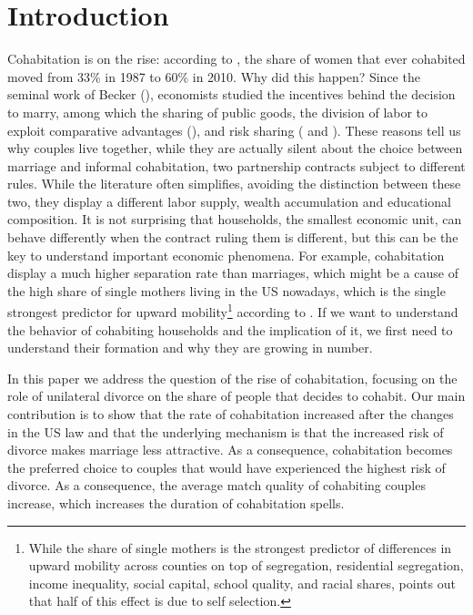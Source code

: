\documentclass[12pt]{article}
\numberwithin{table}{section}
\begin{document}
\section{Introduction}
Cohabitation is on the rise: according to \cite{manning2013}, the share of women that ever cohabited moved from 33\% in 1987 to 60\% in 2010. Why did this happen?
Since the seminal work of Becker (\citealp{becker1981}), economists studied the incentives behind the decision to marry, among which the sharing of public goods, the division of labor to exploit comparative advantages (\citealp{chiappori1997}), and risk sharing (\citealp{voena2015} and \citealp{rigas2015}). These reasons tell us why couples live together, while they are actually silent about the choice between marriage and informal cohabitation, two partnership contracts subject to different rules. While the literature often simplifies, avoiding the distinction between these two, they display a different labor supply, wealth accumulation and educational composition. It is not surprising that households, the smallest economic unit, can behave differently when the contract ruling them is different, but this can be the key to understand important economic phenomena. For example, cohabitation display a much higher separation rate than marriages, which might be a cause of the high share of single mothers living in the US nowadays, which is the single strongest predictor for upward mobility\footnote{While the share of single mothers is the strongest predictor of differences in upward mobility across counties on top of segregation, residential segregation, income inequality, social capital, school quality, and racial shares, \cite{chetty2018} points out that half of this effect is due to self selection.} according to \cite{chetty2018}. If we want to understand the behavior of cohabiting households and the implication of it, we first need to understand their formation and why they are growing in number.

In this paper we address the question of the rise of cohabitation, focusing on the role of unilateral divorce on the share of people that decides to cohabit. Our main contribution is to show that the rate of cohabitation increased after the changes in the US law and that the underlying mechanism is that the increased risk of divorce makes marriage less attractive. As a consequence, cohabitation becomes the preferred choice to couples that would have experienced the highest risk of divorce. As a consequence, the average match quality of cohabiting couples increase, which increases the duration of cohabitation spells.
\end{document}
